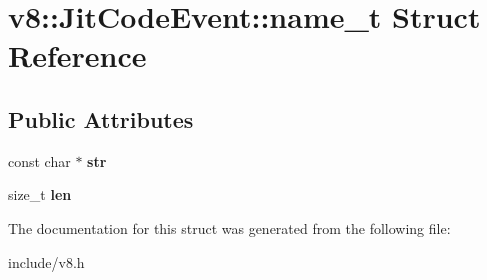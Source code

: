 \hypertarget{structv8_1_1_jit_code_event_1_1name__t}{}\section{v8\+:\+:Jit\+Code\+Event\+:\+:name\+\_\+t Struct Reference}
\label{structv8_1_1_jit_code_event_1_1name__t}
\subsection*{Public Attributes}
\begin{DoxyCompactItemize}
\item 
const char $\ast$ {\bfseries str}\hypertarget{structv8_1_1_jit_code_event_1_1name__t_a344732b4289a6a1fd21bb577ac9eff15}{}\label{structv8_1_1_jit_code_event_1_1name__t_a344732b4289a6a1fd21bb577ac9eff15}

\item 
size\+\_\+t {\bfseries len}\hypertarget{structv8_1_1_jit_code_event_1_1name__t_aa85ddd240f3b08c995caa8267ee8c586}{}\label{structv8_1_1_jit_code_event_1_1name__t_aa85ddd240f3b08c995caa8267ee8c586}

\end{DoxyCompactItemize}


The documentation for this struct was generated from the following file\+:\begin{DoxyCompactItemize}
\item 
include/v8.\+h\end{DoxyCompactItemize}
